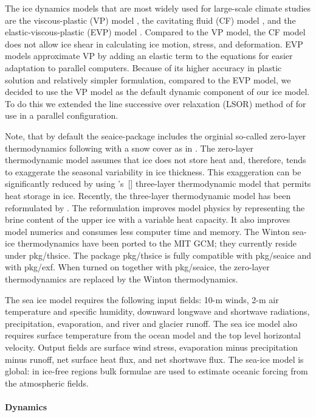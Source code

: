 The ice dynamics models that are most widely used for large-scale
climate studies are the viscous-plastic (VP) model \citep{hib79}, the
cavitating fluid (CF) model \citep{fla92}, and the
elastic-viscous-plastic (EVP) model \citep{hun97}.  Compared to the VP
model, the CF model does not allow ice shear in calculating ice
motion, stress, and deformation.  EVP models approximate VP by adding
an elastic term to the equations for easier adaptation to parallel
computers.  Because of its higher accuracy in plastic solution and
relatively simpler formulation, compared to the EVP model, we decided
to use the VP model as the default dynamic component of our ice
model. To do this we extended the line successive over relaxation
(LSOR) method of \citet{zhang97} for use in a parallel
configuration.

Note, that by default the seaice-package includes the orginial
so-called zero-layer thermodynamics following \citet{hib80} with a
snow cover as in \citet{zha98a}. The zero-layer thermodynamic model
assumes that ice does not store heat and, therefore, tends to
exaggerate the seasonal variability in ice thickness.  This
exaggeration can be significantly reduced by using
\citeauthor{sem76}'s~[\citeyear{sem76}] three-layer thermodynamic model
that permits heat storage in ice.  Recently, the three-layer
thermodynamic model has been reformulated by \citet{win00}.  The
reformulation improves model physics by representing the brine content
of the upper ice with a variable heat capacity.  It also improves
model numerics and consumes less computer time and memory.  The Winton
sea-ice thermodynamics have been ported to the MIT GCM; they currently
reside under pkg/thsice. The package pkg/thsice is fully compatible
with pkg/seaice and with pkg/exf. When turned on together with
pkg/seaice, the zero-layer thermodynamics are replaced by the Winton
thermodynamics.

The sea ice model requires the following input fields: 10-m winds, 2-m
air temperature and specific humidity, downward longwave and shortwave
radiations, precipitation, evaporation, and river and glacier runoff.
The sea ice model also requires surface temperature from the ocean
model and the top level horizontal velocity.  Output fields are
surface wind stress, evaporation minus precipitation minus runoff, net
surface heat flux, and net shortwave flux.  The sea-ice model is
global: in ice-free regions bulk formulae are used to estimate oceanic
forcing from the atmospheric fields.

\paragraph{Dynamics\label{sec:pkg:seaice:dynamics}}

